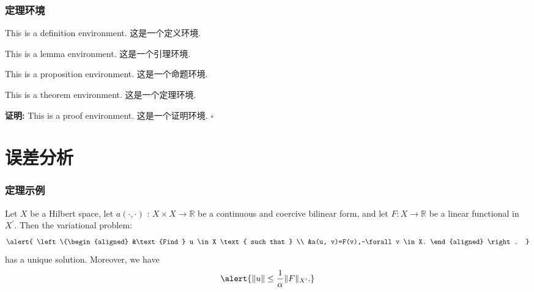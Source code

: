 \documentclass[noamsthm,notheorems,11pt,compress]{beamer}
\numberwithin{figure}{section}
\numberwithin{table}{section}
\numberwithin{equation}{section}
\theoremstyle{plain} %
\newenvironment{proof}[1][证明]{\par\textbf{#1:}%
\enspace\ignorespaces}{\par}
\newcommand{\QED}{\hfill\ensuremath{\square}}
\begin{document}
\begin{frame}
\frametitle{定理环境}
\begin{definition}
This is a definition environment. 这是一个定义环境.
\end{definition}

\begin{lemma}
This is a lemma environment. 这是一个引理环境.
\end{lemma}

\begin{proposition}
This is a proposition environment. 这是一个命题环境.
\end{proposition}

\begin{theorem}\label{thm:MassEnergy}
This is a theorem environment. 这是一个定理环境.
\end{theorem}

\begin{proof}
  This is a proof environment. 这是一个证明环境. \QED
\end{proof}

\end{frame}

\section{误差分析}

\begin{frame}
\frametitle{定理示例}

\begin{theorem}
Let $X$ be a Hilbert space, let $a(\cdot, \cdot)$ : $X \times X \rightarrow \mathbb{R}$ be a continuous and coercive bilinear form, and let $F : X \rightarrow \mathbb{R}$ be a linear functional in $X^{\prime}$. Then the variational problem:
\begin{equation}
  \alert{
  \left\{\begin{aligned}
  &\text {Find } u \in X \text { such that } \\
  &a(u, v)=F(v),~\forall v \in X.
  \end{aligned} \right. }
\end{equation}
has a unique solution. Moreover, we have
\begin{equation}
  \alert{ \|u\| \leq \frac{1}{\alpha}\|F\|_{X^{\prime}}.  }
\end{equation}
\end{theorem}

\end{frame}
\end{document}

